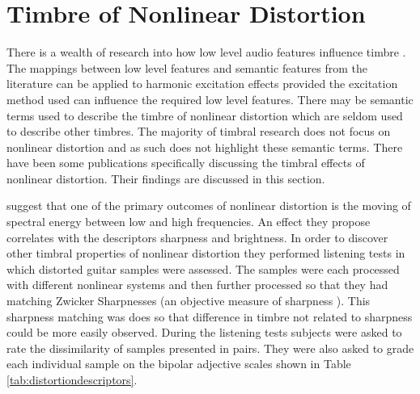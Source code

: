 \section{Timbre of Nonlinear Distortion}
\label{sec:Excitation-Timbre}
	There is a wealth of research into how low level audio features influence timbre . The mappings between low level features and semantic features from the literature can be
	applied to harmonic excitation effects provided the excitation method used can influence the required low level
	features. There may be semantic terms used to describe the timbre of nonlinear distortion which are seldom used to
	describe other timbres. The majority of timbral research does not focus on nonlinear distortion and as such does not
	highlight these semantic terms. There have been some publications specifically discussing the timbral effects of
	nonlinear distortion. Their findings are discussed in this section.

	\citet{marui2005predicting} suggest that one of the primary outcomes of nonlinear distortion is the moving
	of spectral energy between low and high frequencies. An effect they propose correlates with the descriptors
	sharpness and brightness. In order to discover other timbral properties of nonlinear distortion they performed
	listening tests in which distorted guitar samples were assessed. The samples were each processed with different
	nonlinear systems and then further processed so that they had matching Zwicker Sharpnesses (an objective measure of
	sharpness \cite{fastl2007psychoacoustics}). This sharpness matching was does so that difference in timbre not
	related to sharpness could be more easily observed. During the listening tests subjects were asked to rate the
	dissimilarity of samples presented in pairs. They were also asked to grade each individual sample on the bipolar
	adjective scales shown in Table \ref{tab:distortiondescriptors}.

